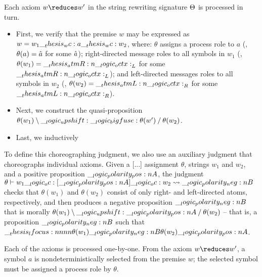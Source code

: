 Each axiom $w \reduces w'$ in the string rewriting signature $\Theta$ is processed in turn.
\begin{itemize}
\item First, we verify that the premise $w$ may be expressed as $w = w_1 \wc a \wc w_2$, where:
$\theta$ assigns a process role to $a$ (\ie, $\theta(a) = \hat{a}$ for some $\hat{a}$);
right-directed message roles to all symbols in $w_1$ (\ie, $\theta(w_1) = \__thesis_atmR:n {\__logic_octx:}_L$ for some $\__thesis_atmR:n {\__logic_octx:}_L$);
and left-directed messages roles to all symbols in $w_2$ (\ie, $\theta(w_2) = \__thesis_atmL:n {\__logic_octx:}_R$ for some $\__thesis_atmL:n {\__logic_octx:}_R$).

\item
  Next, we construct the quasi-proposition $\theta(w_1) \mathbin { \setminus } \__logic_upshift: \__logic_bigfuse: \theta(w') \mathbin { / } \theta(w_2)$.

\item
  Last, we inductively 
\end{itemize}

To define this choreographing judgment, we also use an auxiliary judgment that choreographs individual axioms.
Given a [...] assignment $\theta$, strings $w_1$ and $w_2$, and a positive proposition $\__logic_polarity_pos:n {A}$, the judgment $\theta \vdash w_1 \__logic_oc: [\__logic_polarity_pos:n {A}] \__logic_oc: w_2 \rightsquigarrow \__logic_polarity_neg:n {B}$ checks that $\theta(w_1)$ and $\theta(w_2)$ consist of only right- and left-directed atoms, respectively, and then produces a negative proposition $\__logic_polarity_neg:n {B}$ that is morally $\theta(w_1) \mathbin { \setminus } \__logic_upshift: \__logic_polarity_pos:n {A} \mathbin { / } \theta(w_2)$ -- that is, a proposition $\__logic_polarity_neg:n {B}$ such that $\__thesis_lfocus:nnnn {\theta(w_1)} {\__logic_polarity_neg:n {B}} {\theta(w_2)} {\__logic_polarity_pos:n {A}}$.

Each of the axioms is processed one-by-one.
From the axiom $w \reduces w'$, a symbol $a$ is nondeterministically selected from the premise $w$;
the selected symbol must be assigned a process role by $\theta$.

